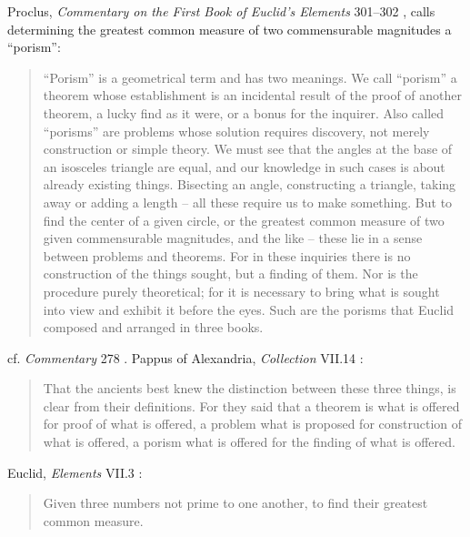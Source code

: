 \documentclass{article}
\begin{document}
Proclus, {\em Commentary on the First Book of Euclid's Elements} 301--302  \cite[p.~236]{proclus}, calls determining the greatest common measure of two commensurable magnitudes
a ``porism'':

\begin{quote}
``Porism'' is a geometrical term and has two meanings.
We call ``porism'' a theorem whose establishment is an
incidental result of the proof of another theorem, a lucky find
as it were, or a bonus for the inquirer. Also called ``porisms''
are problems whose solution requires discovery, not merely
construction or simple theory. We must see that the angles
at the base of an isosceles triangle are equal, and our
knowledge in such cases is about already existing things. Bisecting
an angle, constructing a triangle, taking away or adding a
length -- all these require us to make something. But to find
the center of a given circle, or the greatest common measure
of two given commensurable magnitudes, and the like -- these
lie in a sense between problems and theorems. For in these
inquiries there is no construction of the things sought, but a
finding of them. Nor is the procedure purely theoretical; for it
is necessary to bring what is sought into view and exhibit it
before the eyes. Such are the porisms that Euclid composed
and arranged in three books.
\end{quote}

cf. {\em Commentary} 278 \cite[p.~217]{proclus}. Pappus of Alexandria, {\em Collection} VII.14 \cite[p.~96]{pappus7}:

\begin{quote}
That the ancients best knew the distinction between these three
things, is clear from their definitions. For they said that a theorem is what
is offered for proof of what is offered, a problem what is proposed for
construction of what is offered, a porism what is offered for the finding of
what is offered. 
\end{quote}


 
Euclid, {\em Elements} VII.3 \cite[p.~300]{euclidII}:

\begin{quote}
Given three numbers not prime to one another, to find their
greatest common measure.
\end{quote}
\end{document}
